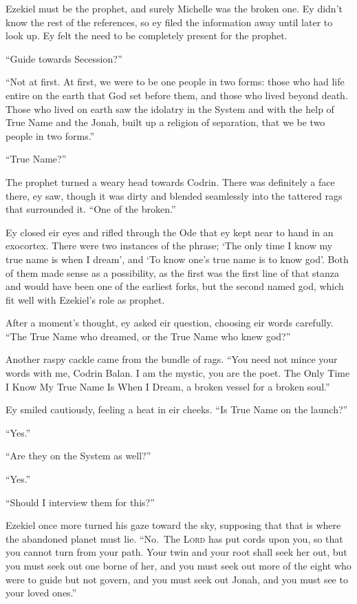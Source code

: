 Ezekiel must be the prophet, and surely Michelle was the broken one. Ey didn't know the rest of the references, so ey filed the information away until later to look up. Ey felt the need to be completely present for the prophet.

``Guide towards Secession?''

``Not at first. At first, we were to be one people in two forms: those who had life entire on the earth that God set before them, and those who lived beyond death. Those who lived on earth saw the idolatry in the System and with the help of True Name and the Jonah, built up a religion of separation, that we be two people in two forms.''

``True Name?''

The prophet turned a weary head towards Codrin. There was definitely a face there, ey saw, though it was dirty and blended seamlessly into the tattered rags that surrounded it. ``One of the broken.''

Ey closed eir eyes and rifled through the Ode that ey kept near to hand in an exocortex. There were two instances of the phrase; `The only time I know my true name is when I dream', and `To know one's true name is to know god'. Both of them made sense as a possibility, as the first was the first line of that stanza and would have been one of the earliest forks, but the second named god, which fit well with Ezekiel's role as prophet.

After a moment's thought, ey asked eir question, choosing eir words carefully. ``The True Name who dreamed, or the True Name who knew god?''

Another raspy cackle came from the bundle of rags. ``You need not mince your words with me, Codrin Balan. I am the mystic, you are the poet. The Only Time I Know My True Name Is When I Dream, a broken vessel for a broken soul.''

Ey smiled cautiously, feeling a heat in eir cheeks. ``Is True Name on the launch?''

``Yes.''

``Are they on the System as well?''

``Yes.''

``Should I interview them for this?''

Ezekiel once more turned his gaze toward the sky, supposing that that is where the abandoned planet must lie. ``No.~The \textsc{Lord} has put cords upon you, so that you cannot turn from your path. Your twin and your root shall seek her out, but you must seek out one borne of her, and you must seek out more of the eight who were to guide but not govern, and you must seek out Jonah, and you must see to your loved ones.''

